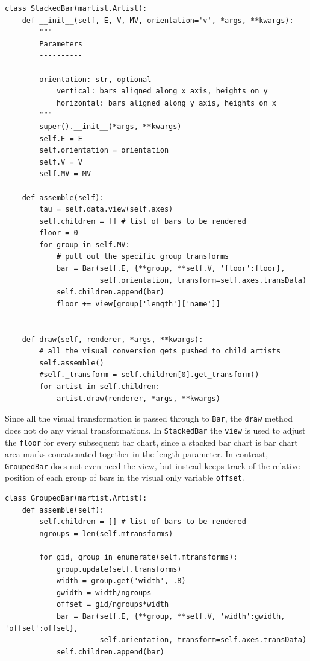 \documentclass[../main.tex]{subfiles}
\begin{document}
\begin{verbatim}
class StackedBar(martist.Artist):
    def __init__(self, E, V, MV, orientation='v', *args, **kwargs):
        """
        Parameters
        ----------
   
        orientation: str, optional
            vertical: bars aligned along x axis, heights on y
            horizontal: bars aligned along y axis, heights on x   
        """
        super().__init__(*args, **kwargs)
        self.E = E
        self.orientation = orientation
        self.V = V
        self.MV = MV

    def assemble(self):
        tau = self.data.view(self.axes)
        self.children = [] # list of bars to be rendered
        floor = 0
        for group in self.MV:
            # pull out the specific group transforms
            bar = Bar(self.E, {**group, **self.V, 'floor':floor}, 
                      self.orientation, transform=self.axes.transData)
            self.children.append(bar)
            floor += view[group['length']['name']]
            
            
    def draw(self, renderer, *args, **kwargs):
        # all the visual conversion gets pushed to child artists
        self.assemble()
        #self._transform = self.children[0].get_transform()
        for artist in self.children:
            artist.draw(renderer, *args, **kwargs)

\end{verbatim}

Since all the visual transformation is passed through to \texttt{Bar}, the \texttt{draw} method does not do any visual transformations. In \texttt{StackedBar} the \texttt{view} is used to adjust the \texttt{floor} for every subsequent bar chart, since a stacked bar chart is bar chart area marks concatenated together in the length parameter. In contrast, \texttt{GroupedBar} does not even need the view, but instead keeps track of the relative position of each group of bars in the visual only variable \texttt{offset}. 

\begin{verbatim}
class GroupedBar(martist.Artist):
    def assemble(self):
        self.children = [] # list of bars to be rendered
        ngroups = len(self.mtransforms)
        
        for gid, group in enumerate(self.mtransforms):
            group.update(self.transforms)
            width = group.get('width', .8)
            gwidth = width/ngroups
            offset = gid/ngroups*width 
            bar = Bar(self.E, {**group, **self.V, 'width':gwidth, 'offset':offset}, 
                      self.orientation, transform=self.axes.transData)     
            self.children.append(bar)
\end{verbatim}
\end{document}
